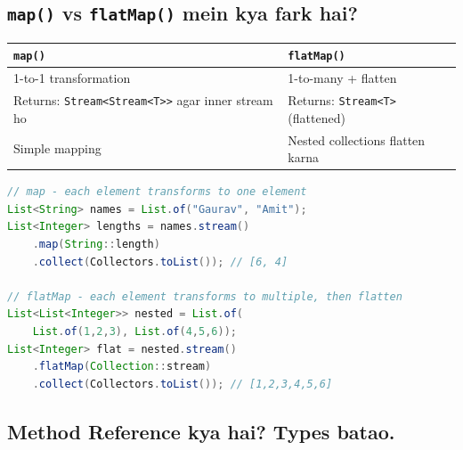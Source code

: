 \documentclass[12pt,a4paper]{article}
\begin{document}
\subsection{\texttt{map()} vs \texttt{flatMap()} mein kya fark hai?}

\begin{answerbox}
\begin{center}
\begin{tabular}{p{6cm} p{6cm}}
\toprule
\textbf{\texttt{map()}} & \textbf{\texttt{flatMap()}} \\
\midrule
1-to-1 transformation & 1-to-many + flatten \\
Returns: \texttt{Stream<Stream<T>>} agar inner stream ho & Returns: \texttt{Stream<T>} (flattened) \\
Simple mapping & Nested collections flatten karna \\
\bottomrule
\end{tabular}
\end{center}
\begin{lstlisting}[language=Java]
// map - each element transforms to one element
List<String> names = List.of("Gaurav", "Amit");
List<Integer> lengths = names.stream()
    .map(String::length)
    .collect(Collectors.toList()); // [6, 4]

// flatMap - each element transforms to multiple, then flatten
List<List<Integer>> nested = List.of(
    List.of(1,2,3), List.of(4,5,6));
List<Integer> flat = nested.stream()
    .flatMap(Collection::stream)
    .collect(Collectors.toList()); // [1,2,3,4,5,6]
\end{lstlisting}
\end{answerbox}

\subsection{Method Reference kya hai? Types batao.}
\end{document}
